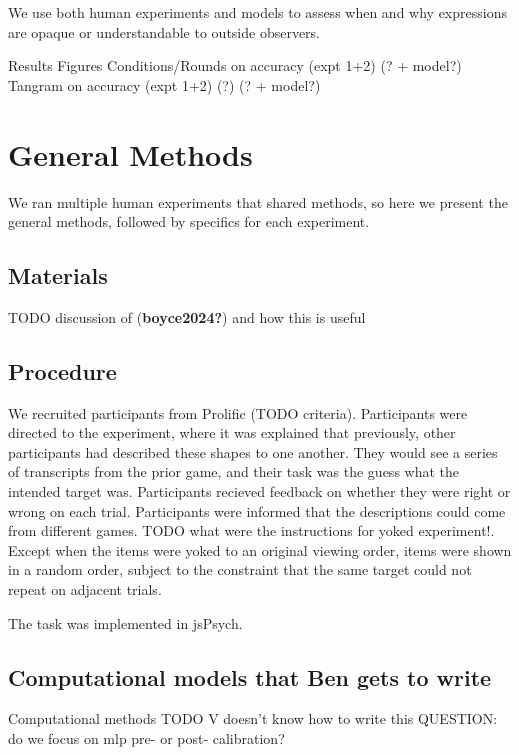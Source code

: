 \documentclass[10pt, letterpaper]{article}
\begin{document}
We use both human experiments and models to assess when and why
expressions are opaque or understandable to outside observers.

Results Figures Conditions/Rounds on accuracy (expt 1+2) (? + model?)
Tangram on accuracy (expt 1+2) (?) (? + model?)

\section{General Methods}\label{general-methods}

We ran multiple human experiments that shared methods, so here we
present the general methods, followed by specifics for each experiment.

\subsection{Materials}\label{materials}

TODO discussion of (\textbf{boyce2024?}) and how this is useful

\subsection{Procedure}\label{procedure}

We recruited participants from Prolific (TODO criteria). Participants
were directed to the experiment, where it was explained that previously,
other participants had described these shapes to one another. They would
see a series of transcripts from the prior game, and their task was the
guess what the intended target was. Participants recieved feedback on
whether they were right or wrong on each trial. Participants were
informed that the descriptions could come from different games. TODO
what were the instructions for yoked experiment!. Except when the items
were yoked to an original viewing order, items were shown in a random
order, subject to the constraint that the same target could not repeat
on adjacent trials.

The task was implemented in jsPsych.

\subsection{Computational models that Ben gets to
write}\label{computational-models-that-ben-gets-to-write}

Computational methods TODO V doesn't know how to write this QUESTION: do
we focus on mlp pre- or post- calibration?
\end{document}

